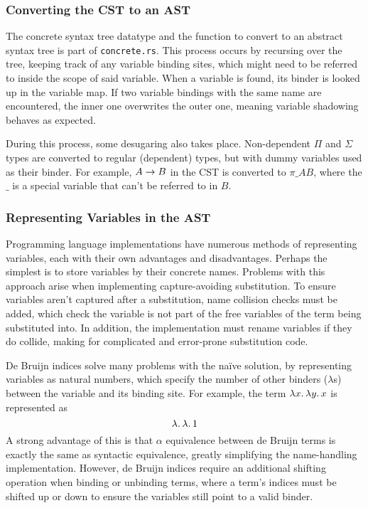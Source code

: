 \documentclass[12pt,a4paper,twoside]{report}
\begin{document}
\subsubsection{Converting the CST to an AST}

The concrete syntax tree datatype and the function to convert to an abstract syntax tree is part of \texttt{concrete.rs}.
This process occurs by recursing over the tree, keeping track of any variable binding sites, which might need to be referred to inside the scope of said variable.
When a variable is found, its binder is looked up in the variable map.
If two variable bindings with the same name are encountered, the inner one overwrites the outer one, meaning variable shadowing behaves as expected.

During this process, some desugaring also takes place.
Non-dependent \(\Pi\) and \(\Sigma\) types are converted to regular (dependent) types, but with dummy variables used as their binder.
For example, \(A \rightarrow B\) in the CST is converted to \(\pi{\_}{A}{B}\), where the \(\_\) is a special variable that can't be referred to in \(B\).

\subsubsection{Representing Variables in the AST}

Programming language implementations have numerous methods of representing variables, each with their own advantages and disadvantages.
Perhaps the simplest is to store variables by their concrete names.
Problems with this approach arise when implementing capture-avoiding substitution.
To ensure variables aren't captured after a substitution, name collision checks must be added, which check the variable is not part of the free variables of the term being substituted into.
In addition, the implementation must rename variables if they do collide, making for complicated and error-prone substitution code.

De Bruijn indices \cite{debruijn72} solve many problems with the na\"ive solution, by representing variables as natural numbers, which specify the
number of other binders (\(\lambda\)s) between the variable and its binding site.
For example, the term \(\lambda x \ldotp \lambda y \ldotp x\) is represented as
\[
    \lambda \ldotp \lambda \ldotp 1
\]
A strong advantage of this is that \(\alpha\) equivalence between de Bruijn terms is exactly the same as syntactic equivalence, greatly simplifying the name-handling implementation.
However, de Bruijn indices require an additional shifting operation when binding or unbinding terms, where a term's indices must be shifted up or down to ensure the variables still point to a valid binder.
\end{document}
